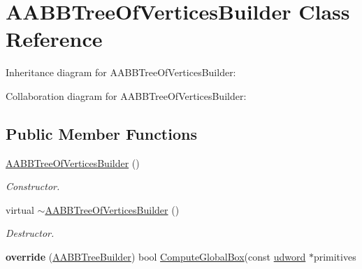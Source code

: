 \hypertarget{class_a_a_b_b_tree_of_vertices_builder}{\section{A\+A\+B\+B\+Tree\+Of\+Vertices\+Builder Class Reference}
\label{class_a_a_b_b_tree_of_vertices_builder}
}


Inheritance diagram for A\+A\+B\+B\+Tree\+Of\+Vertices\+Builder\+:


Collaboration diagram for A\+A\+B\+B\+Tree\+Of\+Vertices\+Builder\+:
\subsection*{Public Member Functions}
\begin{DoxyCompactItemize}
\item 
\hypertarget{class_a_a_b_b_tree_of_vertices_builder_a8f78a7745ee4112b13dc5c8dba347787}{\hyperlink{class_a_a_b_b_tree_of_vertices_builder_a8f78a7745ee4112b13dc5c8dba347787}{A\+A\+B\+B\+Tree\+Of\+Vertices\+Builder} ()}\label{class_a_a_b_b_tree_of_vertices_builder_a8f78a7745ee4112b13dc5c8dba347787}

\begin{DoxyCompactList}\small\item\em Constructor. \end{DoxyCompactList}\item 
\hypertarget{class_a_a_b_b_tree_of_vertices_builder_a05cabae50a1583e106430952b7e2d3a5}{virtual \hyperlink{class_a_a_b_b_tree_of_vertices_builder_a05cabae50a1583e106430952b7e2d3a5}{$\sim$\+A\+A\+B\+B\+Tree\+Of\+Vertices\+Builder} ()}\label{class_a_a_b_b_tree_of_vertices_builder_a05cabae50a1583e106430952b7e2d3a5}

\begin{DoxyCompactList}\small\item\em Destructor. \end{DoxyCompactList}\item 
\hypertarget{class_a_a_b_b_tree_of_vertices_builder_ad942b8962dc32f7a550bf47b18d8a7d7}{{\bfseries override} (\hyperlink{class_a_a_b_b_tree_builder}{A\+A\+B\+B\+Tree\+Builder}) bool \hyperlink{class_a_a_b_b_tree_builder_adde85a9974ea5dc2c74fd851e11abf75}{Compute\+Global\+Box}(const \hyperlink{_ice_types_8h_a44c6f1920ba5551225fb534f9d1a1733}{udword} $\ast$primitives}\label{class_a_a_b_b_tree_of_vertices_builder_ad942b8962dc32f7a550bf47b18d8a7d7}


\end{DoxyCompactItemize}
